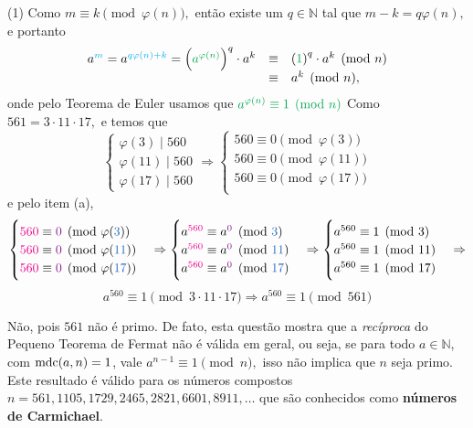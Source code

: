 \documentclass[12pt, a4paper]{article}
\newcommand{\mdc}{{\rm mdc}}
\newcommand{\negrito}[1]{\mbox{\boldmath{$#1$}}}
\newcommand{\itens}[1]{\begin{tasks}[label={(tsk[a])},label-width=3.6ex, label-format = {\bfseries}, column-sep = {0pt}](1) #1\end{tasks}}
\newcommand{\alt}[1]{\textcolor{Floresta}{$\negrito{(#1)} $}}
\begin{document}
\begin{solution}
\itens{
\task[\alt{a}] Como $m \equiv k \pmod{\varphi(n)},$ então existe um $q \in \mathbb{N}$ tal que $m - k = q \varphi(n),$ e portanto
\[
\begin{array}{rcl}
a^{\textcolor{Cyan}{m}} = a^{\textcolor{Cyan}{q \varphi(n) + k}} = \left(\textcolor{Green}{a^{\varphi(n)}}\right)^q \cdot a^k  &\equiv& \left(\textcolor{Green}{1}\right)^q \cdot a^k \pmod n \\
&\equiv& a^k \pmod n,
\end{array}
\]
onde pelo Teorema de Euler usamos que $\textcolor{Green}{a^{\varphi(n)} \equiv 1 \pmod n}$
\task[\alt{b}] Como $561 = 3 \cdot 11 \cdot 17,$ e temos que 
\[\begin{cases}
\varphi(3) \mid 560 \\ \varphi(11) \mid 560 \\ \varphi(17) \mid 560
\end{cases} \Rightarrow \begin{cases} 
560 \equiv 0 \pmod{\varphi(3)} \\
560 \equiv 0 \pmod{\varphi(11)} \\
560 \equiv 0 \pmod{\varphi(17)} \\
\end{cases} 
\]
e pelo item (a),
\[
\begin{cases} 
\textcolor{Magenta}{560} \equiv \textcolor{Plum}{0} \pmod{\varphi(\textcolor{NavyBlue}{3})} \\
\textcolor{Magenta}{560} \equiv \textcolor{Plum}{0} \pmod{\varphi(\textcolor{NavyBlue}{11})} \\
\textcolor{Magenta}{560} \equiv \textcolor{Plum}{0} \pmod{\varphi(\textcolor{NavyBlue}{17})} \\
\end{cases}  \Rightarrow \begin{cases}
a^{\textcolor{Magenta}{560}} \equiv a^{\textcolor{Plum}{0}} \pmod{\textcolor{NavyBlue}{3}} \\
a^{\textcolor{Magenta}{560}} \equiv a^{\textcolor{Plum}{0}} \pmod{\textcolor{NavyBlue}{11}} \\
a^{\textcolor{Magenta}{560}} \equiv a^{\textcolor{Plum}{0}} \pmod{\textcolor{NavyBlue}{17}} \\
\end{cases} \Rightarrow \begin{cases}
a^{560} \equiv 1 \pmod{3} \\
a^{560} \equiv 1 \pmod{11} \\
a^{560} \equiv 1 \pmod{17} \\
\end{cases} \Rightarrow \]\[ a^{560} \equiv 1 \pmod{3 \cdot 11 \cdot 17}\Rightarrow  a^{560} \equiv 1 \pmod{561}
\]

Não, pois $561$ não é primo. De fato, esta questão mostra que a \textit{recíproca} do Pequeno Teorema de Fermat não é válida em geral, ou seja, se para todo $a \in \mathbb{N}$, com $\mdc(a,n) = 1$, vale $a^{n-1} \equiv 1 \pmod{n},$ isso não implica que $n$ seja primo. Este resultado é válido para os números compostos $n = 561, 1105, 1729, 2465, 2821, 6601, 8911, \ldots$ que são conhecidos como \textbf{números de Carmichael}. 
}
\end{solution}
\end{document}
